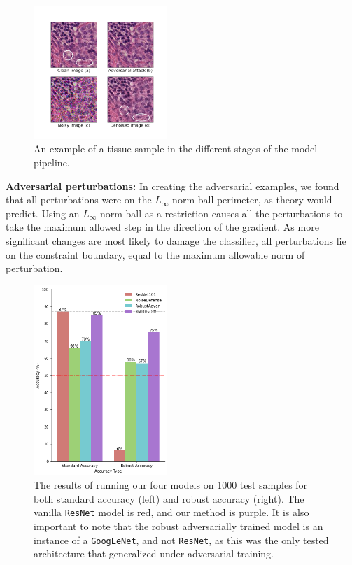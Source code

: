 \documentclass[twocolumn]{article}
\begin{document}
\begin{figure}
    \includegraphics[width=0.45\textwidth]{Figures/images_tissue.png}
    \caption{An example of a tissue sample in the different stages of the model pipeline.}
    \label{fig:tissue-img}
\end{figure}


\textbf{Adversarial perturbations:}
In creating the adversarial examples, we found that all perturbations were on the $L_\infty$ norm ball perimeter, as theory would predict. Using an $L_\infty$ norm ball as a restriction causes all the perturbations to take the maximum allowed step in the direction of the gradient. As more significant changes are most likely to damage the classifier, all perturbations lie on the constraint boundary, equal to the maximum allowable norm of perturbation.



\begin{figure}
    \includegraphics[width=0.45\textwidth]{Figures/result_bar.png}
    \caption{The results of running our four models on 1000 test samples for both standard accuracy (left) and robust accuracy (right). The vanilla \texttt{ResNet} model is red, and our method is purple. It is also important to note that the robust adversarially trained model is an instance of a \texttt{GoogLeNet}, and not \texttt{ResNet}, as this was the only tested architecture that generalized under adversarial training.}
    \vspace*{-1mm}
    \label{fig:results}
\end{figure}
\end{document}
